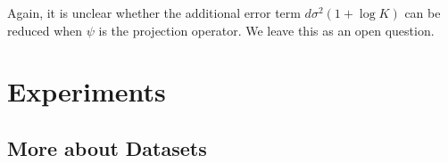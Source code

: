 Again, it is unclear whether the additional error term $d\sigma^2(1+\log K)$ can be reduced when $\psi$ is the projection operator.
We leave this as an open question.






\section{Experiments}
\label{sec:appendix_experiments}



\subsection{More about Datasets}
\label{subsec:appendix_datasets}

